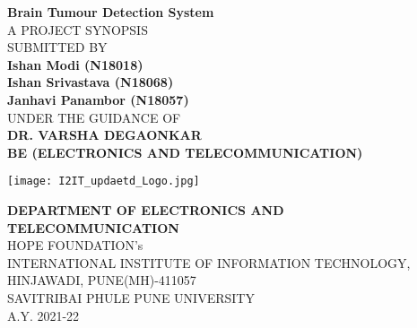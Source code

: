 \begin{center}
\vspace{0.8cm}
{\bf \LARGE Brain Tumour Detection System} \\ \vspace{1 cm}
{A PROJECT SYNOPSIS}\\ \vspace{0.6 cm}
{SUBMITTED BY}\\ \vspace{0.8 cm}
{\large \bf  Ishan Modi (N18018)}\\ \vspace{0.1 cm}
{\large \bf  Ishan Srivastava (N18068)}\\ \vspace{0.1 cm}
{\large \bf  Janhavi Panambor (N18057)}\\ \vspace{0.8 cm}
{ UNDER THE GUIDANCE OF}\\ \vspace{0.8 cm}
{ \large \bf  DR. VARSHA DEGAONKAR }\\ \vspace{0.8 cm}
{\textbf{BE (ELECTRONICS AND TELECOMMUNICATION)}}\\\vspace{0.8 cm}
\begin{figure*}[!h]
\centering
\texttt{[image: I2IT\_updaetd\_Logo.jpg]}
\end{figure*} \vspace{0.1 cm} 
{\textbf{DEPARTMENT OF ELECTRONICS AND TELECOMMUNICATION}}\\ \vspace{0.1 cm}
{HOPE FOUNDATION's} \\ \vspace{0.1 cm}
{INTERNATIONAL INSTITUTE OF INFORMATION TECHNOLOGY,} \\ \vspace{0.1 cm}
{HINJAWADI, PUNE(MH)-411057}\\ \vspace{0.1 cm}
{SAVITRIBAI PHULE PUNE UNIVERSITY}\\ \vspace{0.1 cm}
{A.Y. 2021-22}
\end{center} 

